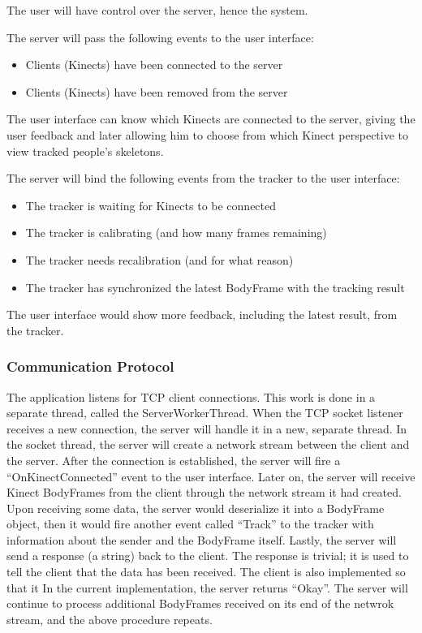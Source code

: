 The user will have control over the server, hence the system.

The server will pass the following events to the user interface:

\begin{itemize}
  \item Clients (Kinects) have been connected to the server
  \item Clients (Kinects) have been removed from the server
\end{itemize}

The user interface can know which Kinects are connected to the server, giving the user feedback and later allowing him to choose from which Kinect perspective to view tracked people's skeletons.

The server will bind the following events from the tracker to the user interface:

\begin{itemize}
  \item The tracker is waiting for Kinects to be connected
  \item The tracker is calibrating (and how many frames remaining)
  \item The tracker needs recalibration (and for what reason)
  \item The tracker has synchronized the latest BodyFrame with the tracking result 
\end{itemize}

The user interface would show more feedback, including the latest result, from the tracker.

\subsubsection{Communication Protocol}

The application listens for TCP client connections. This work is done in a separate thread, called the ServerWorkerThread. When the TCP socket listener receives a new connection, the server will handle it in a new, separate thread. In the socket thread, the server will create a network stream between the client and the server. After the connection is established, the server will fire a ``OnKinectConnected'' event to the user interface. Later on, the server will receive Kinect BodyFrames from the client through the network stream it had created. Upon receiving some data, the server would deserialize it into a BodyFrame object, then it would fire another event called ``Track'' to the tracker with information about the sender and the BodyFrame itself. Lastly, the server will send a response (a string) back to the client. The response is trivial; it is used to tell the client that the data has been received. The client is also implemented so that it In the current implementation, the server returns ``Okay''. The server will continue to process additional BodyFrames received on its end of the netwrok stream, and the above procedure repeats.

